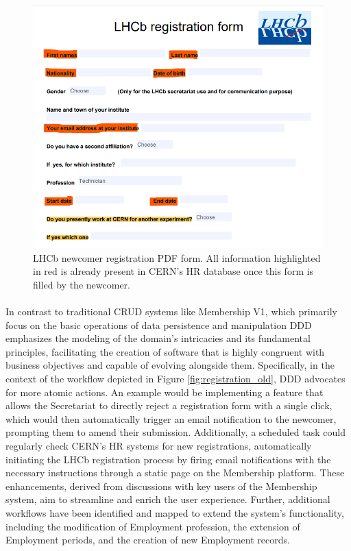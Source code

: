 \begin{figure}[H]
    \centering
    \includegraphics[width=0.6\linewidth]{figuras/lhcb_form.png}
    \caption{LHCb newcomer registration PDF form. All information highlighted in red is already present in CERN's HR database once this form is filled by the newcomer.}
    \label{fig:lhcb_registration_form_pdf}
\end{figure}

\paragraph{} In contrast to traditional CRUD systems like Membership V1, which primarily focus on the basic operations of data persistence and manipulation DDD emphasizes the modeling of the domain's intricacies and its fundamental principles, facilitating the creation of software that is highly congruent with business objectives and capable of evolving alongside them. Specifically, in the context of the workflow depicted in Figure \ref{fig:registration_old}, DDD advocates for more atomic actions. An example would be implementing a feature that allows the Secretariat to directly reject a registration form with a single click, which would then automatically trigger an email notification to the newcomer, prompting them to amend their submission. Additionally, a scheduled task could regularly check CERN's HR systems for new registrations, automatically initiating the LHCb registration process by firing email notifications with the necessary instructions through a static page on the Membership platform. These enhancements, derived from discussions with key users of the Membership system, aim to streamline and enrich the user experience. Further, additional workflows have been identified and mapped to extend the system's functionality, including the modification of Employment profession, the extension of Employment periods, and the creation of new Employment records. 


